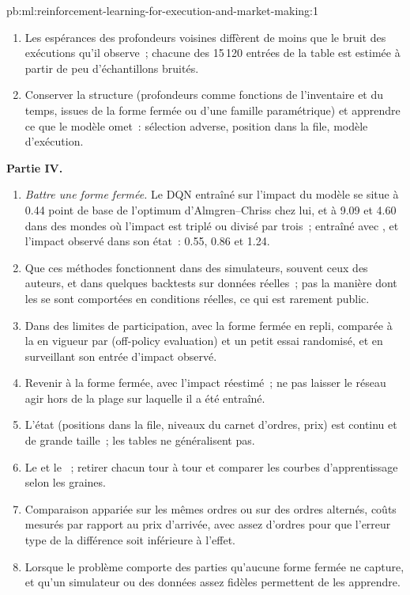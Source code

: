 \begin{solution}{pb:ml:reinforcement-learning-for-execution-and-market-making:1}
\begin{enumerate}[resume]
\item Les espérances des profondeurs voisines diffèrent de moins que le bruit des exécutions qu'il observe~; chacune des 15\,120 entrées
de la table est estimée à partir de peu d'échantillons bruités.
\item Conserver la structure (profondeurs comme fonctions de l'inventaire et du temps, issues de la forme fermée ou d'une famille paramétrique) et apprendre
ce que le modèle omet~: sélection adverse, position dans la file, modèle d'exécution.
\end{enumerate}
\textbf{Partie IV.}
\begin{enumerate}[resume]
\item \emph{Battre une forme fermée.} Le DQN entraîné sur l'impact du modèle se situe à 0.44 point de base
de l'optimum d'Almgren--Chriss chez lui, et à 9.09 et 4.60 dans des mondes où l'impact est triplé ou divisé par trois~; entraîné avec ,
et l'impact observé dans son état~: 0.55, 0.86 et 1.24.
\item Que ces méthodes fonctionnent dans des simulateurs, souvent ceux des auteurs, et dans quelques backtests sur données réelles~; pas la manière dont les 
se sont comportées en conditions réelles, ce qui est rarement public.
\item Dans des limites de participation, avec la forme fermée en repli, comparée à la  en vigueur par  (off-policy evaluation) et
un petit essai randomisé, et en surveillant son entrée d'impact observé.
\item Revenir à la forme fermée, avec l'impact réestimé~; ne pas laisser le réseau agir hors de la plage sur laquelle il a été entraîné.
\item L'état (positions dans la file, niveaux du carnet d'ordres, prix) est continu et de grande taille~; les tables ne généralisent pas.
\item Le  et le ~; retirer chacun tour à tour et comparer les courbes d'apprentissage selon les graines.
\item Comparaison appariée sur les mêmes ordres ou sur des ordres alternés, coûts mesurés par rapport au prix d'arrivée, avec assez d'ordres
pour que l'erreur type de la différence soit inférieure à l'effet.
\item Lorsque le problème comporte des parties qu'aucune forme fermée ne capture, et qu'un simulateur ou des données assez fidèles permettent de les apprendre.
\end{enumerate}
\end{solution}

